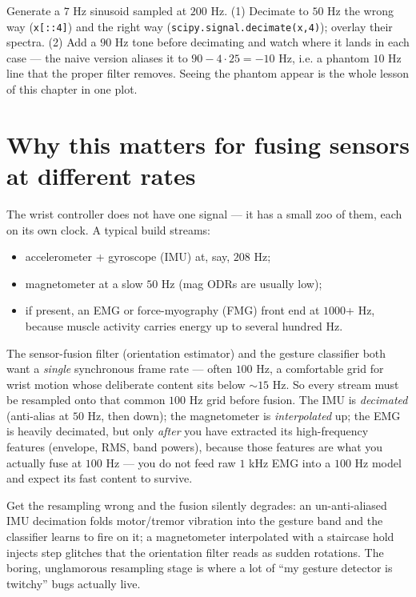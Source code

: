 \begin{labbox}
Generate a $7$ Hz sinusoid sampled at $200$ Hz. (1) Decimate to $50$ Hz the wrong
way (\texttt{x[::4]}) and the right way (\texttt{scipy.signal.decimate(x,4)});
overlay their spectra. (2) Add a $90$ Hz tone before decimating and watch where it
lands in each case --- the naive version aliases it to $90-4\cdot 25 = -10$ Hz,
i.e. a phantom $10$ Hz line that the proper filter removes. Seeing the phantom
appear is the whole lesson of this chapter in one plot.
\end{labbox}

\section{Why this matters for fusing sensors at different rates}
\label{ch22:fusion}

\begin{goalbox}
The wrist controller does not have one signal --- it has a small zoo of them,
each on its own clock. A typical build streams:
\begin{itemize}
  \item accelerometer + gyroscope (IMU) at, say, $208$ Hz;
  \item magnetometer at a slow $50$ Hz (mag ODRs are usually low);
  \item if present, an EMG or force-myography (FMG) front end at $1000$+ Hz,
  because muscle activity carries energy up to several hundred Hz.
\end{itemize}
The sensor-fusion filter (orientation estimator) and the gesture classifier both
want a \emph{single} synchronous frame rate --- often $100$ Hz, a comfortable
grid for wrist motion whose deliberate content sits below $\sim 15$ Hz. So every
stream must be resampled onto that common $100$ Hz grid before fusion. The IMU is
\emph{decimated} (anti-alias at $50$ Hz, then down); the magnetometer is
\emph{interpolated} up; the EMG is heavily decimated, but only \emph{after} you
have extracted its high-frequency features (envelope, RMS, band powers), because
those features are what you actually fuse at $100$ Hz --- you do not feed raw
$1$ kHz EMG into a $100$ Hz model and expect its fast content to survive.

Get the resampling wrong and the fusion silently degrades: an un-anti-aliased IMU
decimation folds motor/tremor vibration into the gesture band and the classifier
learns to fire on it; a magnetometer interpolated with a staircase hold injects
step glitches that the orientation filter reads as sudden rotations. The boring,
unglamorous resampling stage is where a lot of ``my gesture detector is twitchy''
bugs actually live.
\end{goalbox}

